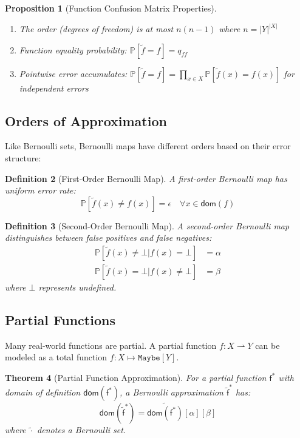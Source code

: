 \documentclass[11pt,final,hidelinks]{article}
\newtheorem{theorem}{Theorem}[section]
\newtheorem{proposition}[theorem]{Proposition}
\newtheorem{definition}[theorem]{Definition}
\newcommand{\obs}[1]{\widetilde{#1}}  %
\newcommand{\PFun}[1]{\mathsf{#1}^*}      %
\newcommand{\APFun}[1]{\obs{\mathsf{#1}}^*}  %
\newcommand{\ASet}[1]{\obs{#1}}       %
\newcommand{\Type}[1]{\mathtt{#1}}
\newcommand{\Prob}[1]{\mathbb{P}\left[#1\right]}
\newcommand{\fprate}{\alpha}
\newcommand{\fnrate}{\beta}
\newcommand{\error}{\epsilon}
\newcommand{\Maybe}[1]{\Type{Maybe}[#1]}
\newcommand{\pfun}{\rightharpoonup}
\newcommand{\Dom}{\mathsf{dom}}
\begin{document}
\begin{proposition}[Function Confusion Matrix Properties]
\begin{enumerate}
    \item The order (degrees of freedom) is at most $n(n-1)$ where $n = |Y|^{|X|}$
    \item Function equality probability: $\Prob{\obs{f} = f} = q_{ff}$
    \item Pointwise error accumulates: $\Prob{\obs{f} = f} = \prod_{x \in X} \Prob{\obs{f}(x) = f(x)}$ for independent errors
\end{enumerate}
\end{proposition}

\subsection{Orders of Approximation}

Like Bernoulli sets, Bernoulli maps have different orders based on their error structure:

\begin{definition}[First-Order Bernoulli Map]
A first-order Bernoulli map has uniform error rate:
\begin{equation}
\Prob{\obs{f}(x) \neq f(x)} = \error \quad \forall x \in \Dom(f)
\end{equation}
\end{definition}

\begin{definition}[Second-Order Bernoulli Map]
A second-order Bernoulli map distinguishes between false positives and false negatives:
\begin{align}
\Prob{\obs{f}(x) \neq \bot | f(x) = \bot} &= \fprate \\
\Prob{\obs{f}(x) = \bot | f(x) \neq \bot} &= \fnrate
\end{align}
where $\bot$ represents undefined.
\end{definition}

\subsection{Partial Functions}

Many real-world functions are partial. A partial function $f : X \pfun Y$ can be modeled as a total function $f : X \mapsto \Maybe{Y}$.

\begin{theorem}[Partial Function Approximation]
For a partial function $\PFun{f}$ with domain of definition $\Dom(\PFun{f})$, a Bernoulli approximation $\APFun{f}$ has:
\begin{equation}
\Dom(\APFun{f}) = \ASet{\Dom(\PFun{f})}[\fprate][\fnrate]
\end{equation}
where $\ASet{\cdot}$ denotes a Bernoulli set.
\end{theorem}
\end{document}
